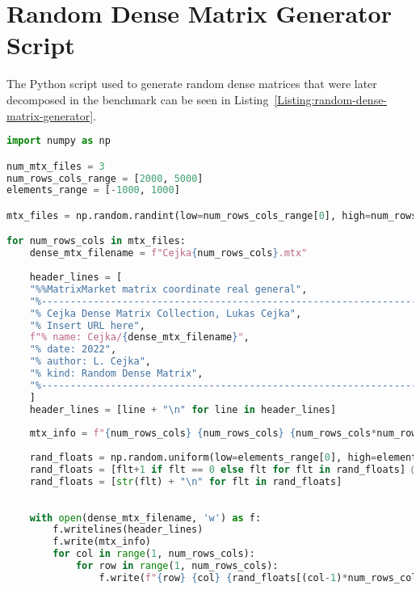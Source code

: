 \chapter{Random Dense Matrix Generator Script}\label{Attachment:random-dense-matrix-generator}
The Python script used to generate random dense matrices that were later decomposed in the benchmark can be seen in Listing~\ref{Listing:random-dense-matrix-generator}.
\begin{lstlisting}[language=Python,caption={Python script for generating random dense matrices in the \emph{SuitSparse Matrix Collection} \cite{Davis2011} format. On line~\ref{Line:eliminate-zeros-from-dense-matrix} it can be seen that any zeros were incremented which was done to assure that the matrices produced would be both strongly regular and composed only of nonzero elements.},label={Listing:random-dense-matrix-generator},escapechar=@]
import numpy as np

num_mtx_files = 3
num_rows_cols_range = [2000, 5000]
elements_range = [-1000, 1000]

mtx_files = np.random.randint(low=num_rows_cols_range[0], high=num_rows_cols_range[1], size=num_mtx_files)

for num_rows_cols in mtx_files:
	dense_mtx_filename = f"Cejka{num_rows_cols}.mtx"
	
	header_lines = [
	"%%MatrixMarket matrix coordinate real general",
	"%----------------------------------------------------------------------------",
	"% Cejka Dense Matrix Collection, Lukas Cejka",
	"% Insert URL here",
	f"% name: Cejka/{dense_mtx_filename}",
	"% date: 2022",
	"% author: L. Cejka",
	"% kind: Random Dense Matrix",
	"%----------------------------------------------------------------------------",
	]
	header_lines = [line + "\n" for line in header_lines]
	
	mtx_info = f"{num_rows_cols} {num_rows_cols} {num_rows_cols*num_rows_cols}\n"
	
	rand_floats = np.random.uniform(low=elements_range[0], high=elements_range[1], size=(num_rows_cols*num_rows_cols))
	rand_floats = [flt+1 if flt == 0 else flt for flt in rand_floats] @\label{Line:eliminate-zeros-from-dense-matrix}@
	rand_floats = [str(flt) + "\n" for flt in rand_floats]
	
	
	with open(dense_mtx_filename, 'w') as f:
		f.writelines(header_lines)
		f.write(mtx_info)
		for col in range(1, num_rows_cols):
			for row in range(1, num_rows_cols):
				f.write(f"{row} {col} {rand_floats[(col-1)*num_rows_cols + row - 1]}")
\end{lstlisting}